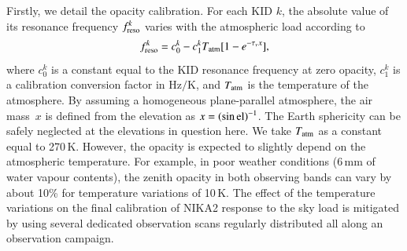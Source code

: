 \documentclass[traditionalabstract]{aa}
\newcommand{\elev}{\rm{el}}
\newcommand{\taunu}{\tau_{\nu}}
\newcommand{\airmass}{air mass}
\newcommand{\lp}[1]{#1}
\begin{document}
{Firstly, we detail the opacity calibration. For each KID $k$, the
absolute value of its resonance frequency $f_{\rm{reso}}^k$ varies with the
atmospheric load according to
%
\begin{equation}
f_{\rm{reso}}^k  = c_0^k - c_1^k T_{\rm{atm}}[1-e^{-\taunu x}],
\label{eq:skydip}
\end{equation}
%
where $c_0^k$ is a constant equal to the KID resonance frequency at zero
opacity, $c_1^k$ is a calibration conversion factor in Hz$/$K, and
$T_{\rm{atm}}$ is the temperature of the atmosphere. %
By assuming a homogeneous plane-parallel atmosphere, the
\airmass\ $x$ is defined from the elevation as
$x = \left(\sin\elev\right)^{-1}$. {\lp The Earth sphericity can be safely
neglected at the elevations in question here.}
We take $T_{\rm{atm}}$ as a constant equal to 270\,K. However, the opacity is
expected to slightly depend on the atmospheric temperature. For
example, in poor weather conditions (6\,mm of water vapour contents),
the zenith opacity in {\lp both observing bands} can vary by
about 10\% for temperature variations of 10\,K. The
effect of the temperature variations on the final
calibration of NIKA2 response to the sky load is mitigated by using
several dedicated observation scans regularly distributed all along an
observation campaign.

}
\end{document}
